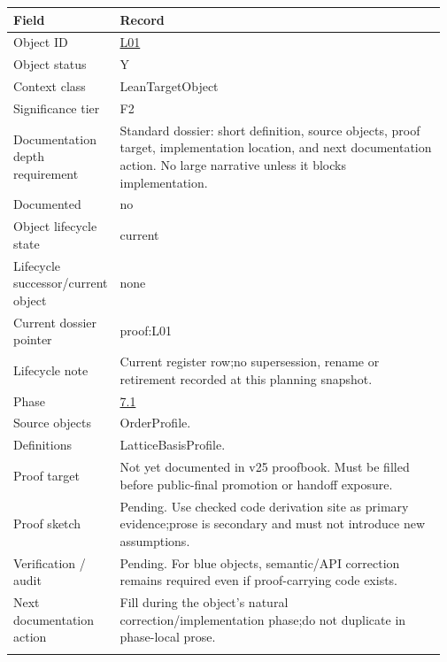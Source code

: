 \begin{longtable}{L{0.16\linewidth} L{0.81\linewidth}}
\hline
\textbf{Field} & \textbf{Record}\\
\hline
Object ID & \hyperlink{object-row-L01}{L01}\\
\hline\addlinespace[0.20em]
Object status & Y\\
\hline\addlinespace[0.20em]
Context class & LeanTargetObject\\
\hline\addlinespace[0.20em]
Significance tier & F2\\
\hline\addlinespace[0.20em]
Documentation depth requirement & Standard dossier: short definition, source objects, proof target, implementation location, and next documentation action. No large narrative unless it blocks implementation.\\
\hline\addlinespace[0.20em]
Documented & no\\
\hline\addlinespace[0.20em]
Object lifecycle state & current\\
\hline\addlinespace[0.20em]
Lifecycle successor/\allowbreak{}current object & none\\
\hline\addlinespace[0.20em]
Current dossier pointer & proof:L01\\
\hline\addlinespace[0.20em]
Lifecycle note & Current register row;\newline no supersession, rename or retirement recorded at this planning snapshot.\\
\hline\addlinespace[0.20em]
Phase & \hyperlink{phase-row-7-1}{7.1}\\
\hline\addlinespace[0.20em]
Source objects & OrderProfile.\\
\hline\addlinespace[0.20em]
Definitions & LatticeBasisProfile.\\
\hline\addlinespace[0.20em]
Proof target & Not yet documented in v25 proofbook. Must be filled before public-final promotion or handoff exposure.\\
\hline\addlinespace[0.20em]
Proof sketch & Pending. Use checked code derivation site as primary evidence;\newline prose is secondary and must not introduce new assumptions.\\
\hline\addlinespace[0.20em]
Verification /\allowbreak{} audit & Pending. For blue objects, semantic/\allowbreak{}API correction remains required even if proof-carrying code exists.\\
\hline\addlinespace[0.20em]
Next documentation action & Fill during the object's natural correction/\allowbreak{}implementation phase;\newline do not duplicate in phase-local prose.\\
\hline\addlinespace[0.20em]
\end{longtable}
